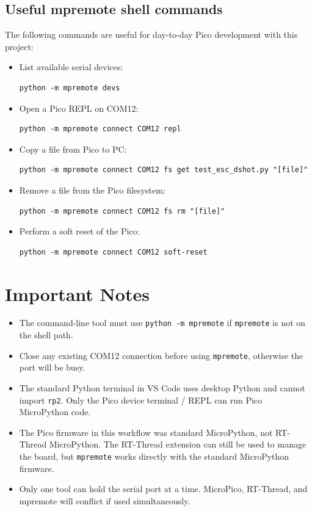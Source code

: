 \documentclass[11pt,a4paper]{article}
\begin{document}
\subsection{Useful mpremote shell commands}
The following commands are useful for day-to-day Pico development with this project:
\begin{itemize}
  \item List available serial devices:
    \begin{verbatim}
python -m mpremote devs
    \end{verbatim}
  \item Open a Pico REPL on COM12:
    \begin{verbatim}
python -m mpremote connect COM12 repl
    \end{verbatim}
  \item Copy a file from Pico to PC:
    \begin{verbatim}
python -m mpremote connect COM12 fs get test_esc_dshot.py "[file]"
    \end{verbatim}
  \item Remove a file from the Pico filesystem:
    \begin{verbatim}
python -m mpremote connect COM12 fs rm "[file]"
    \end{verbatim}
  \item Perform a soft reset of the Pico:
    \begin{verbatim}
python -m mpremote connect COM12 soft-reset
    \end{verbatim}
\end{itemize}

\section{Important Notes}
\begin{itemize}
  \item The command-line tool must use \texttt{python -m mpremote} if \texttt{mpremote} is not on the shell path.
  \item Close any existing COM12 connection before using \texttt{mpremote}, otherwise the port will be busy.
  \item The standard Python terminal in VS Code uses desktop Python and cannot import \texttt{rp2}. Only the Pico device terminal / REPL can run Pico MicroPython code.
  \item The Pico firmware in this workflow was standard MicroPython, not RT-Thread MicroPython. The RT-Thread extension can still be used to manage the board, but \texttt{mpremote} works directly with the standard MicroPython firmware.
  \item Only one tool can hold the serial port at a time. MicroPico, RT-Thread, and mpremote will conflict if used simultaneously.
\end{itemize}
\end{document}
